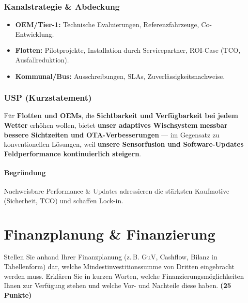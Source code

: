 \documentclass[
%
ngerman %
%
numeric %
]{wbh-assignment}
\begin{document}
\vspace*{5mm}

\subsubsection{Kanalstrategie \& Abdeckung}
\begin{itemize}
  \item \textbf{OEM/Tier-1:} Technische Evaluierungen, Referenzfahrzeuge, Co-Entwicklung.
  \item \textbf{Flotten:} Pilotprojekte, Installation durch Servicepartner, \mbox{ROI-Case} (TCO, Ausfallreduktion).
  \item \textbf{Kommunal/Bus:} Ausschreibungen, SLAs, Zuverlässigkeitsnachweise.
\end{itemize}

\subsubsection{USP (Kurzstatement)}
Für \textbf{Flotten und OEMs}, die \textbf{Sichtbarkeit und Verfügbarkeit bei jedem Wetter} erhöhen wollen, bietet \textbf{unser adaptives Wischsystem} \textbf{messbar bessere Sichtzeiten und OTA-Verbesserungen} --- im Gegensatz zu konventionellen Lösungen, weil \textbf{unsere Sensorfusion und Software-Updates Feldperformance kontinuierlich steigern}.

\paragraph{Begründung}
Nachweisbare Performance \& Updates adressieren die stärksten Kaufmotive (Sicherheit, TCO) und schaffen Lock-in.

\clearpage

\section{Finanzplanung \& Finanzierung}
\label{sec:finanzplanung}

\begin{aufgabenstellung}
Stellen Sie anhand Ihrer Finanzplanung (z.\,B. GuV, Cashflow, Bilanz in Tabellenform) dar, welche Mindestinvestitionssumme von Dritten eingebracht werden muss. Erklären Sie in kurzen Worten, welche Finanzierungsmöglichkeiten Ihnen zur Verfügung stehen und welche Vor- und Nachteile diese haben. \textbf{(25 Punkte)}
\end{aufgabenstellung}
\end{document}
